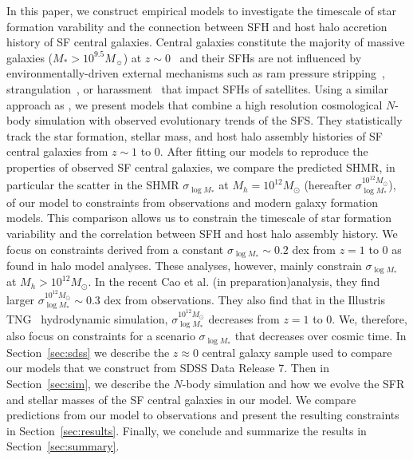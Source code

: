 \documentclass[12pt, letterpaper, preprint, tighten]{aastex62}
\newcommand{\edt}[1]{{\color{dred}{\bf} #1}}
\newcommand{\cao}{Cao et al. (in preparation)}
\newcommand{\siglogm}{\sigma_{\log M_*}}
\begin{document}
\edt{In this paper, we construct empirical models to investigate the timescale
of star formation varability and the connection between SFH and host halo
accretion history of SF central galaxies. 
Central galaxies constitute the majority of massive galaxies ($M_*>10^{9.5}M_\sun$) 
at $z\sim0$~\citep{wetzel2013} and their SFHs are not influenced by 
environmentally-driven external mechanisms such as ram pressure 
stripping~\citep{gunn1972,bekki2009}, strangulation~\citep{larson1980, peng2015}, or 
harassment~\citep{moore1998} that impact SFHs of satellites. 
}
Using a similar approach as \cite{wetzel2013, hahn2017b}, we present models
that combine a high resolution cosmological $N$-body simulation with
observed evolutionary trends of the SFS. They statistically track the 
star formation, stellar mass, and host halo assembly histories of SF central 
galaxies from $z\sim1$ to $0$. 
\edt{After fitting our models to reproduce the properties of observed SF 
central galaxies, we compare the predicted SHMR, in particular the scatter in 
the SHMR $\siglogm$ at $M_h=10^{12}M_\odot$ (hereafter $\siglogm^{10^{12}M_\odot}$), 
of our model to constraints from observations 
and modern galaxy formation models. This comparison allows us to constrain 
the timescale of star formation variability and the correlation between SFH 
and host halo assembly history. We focus on constraints derived from a constant 
$\siglogm\sim0.2$ dex from $z=1$ to 0 as found in halo model analyses. 
These analyses, however, mainly constrain $\siglogm$ at $M_h > 10^{12}M_\odot$. 
In the recent \cao analysis, they find larger $\siglogm^{10^{12} M_\odot} \sim 0.3$ 
dex from observations. They also find that in the Illustris TNG~\citep{pillepich2018} 
hydrodynamic simulation, $\siglogm^{10^{12} M_\odot}$ decreases from 
$z=1$ to $0$. We, therefore, also focus on constraints for a scenario 
$\siglogm$ that decreases over cosmic time. 
}
In Section~\ref{sec:sdss} we describe the $z\approx0$ central galaxy
sample 
\edt{used to compare our models} 
that we construct from SDSS Data Release 7. Then in
Section~\ref{sec:sim}, we describe the $N$-body simulation and how we
evolve the SFR and stellar masses of the SF central galaxies
in our model. We compare predictions from our model to observations
and present the resulting constraints in Section~\ref{sec:results}.
Finally, we conclude and summarize the results in Section~\ref{sec:summary}.
\end{document}
